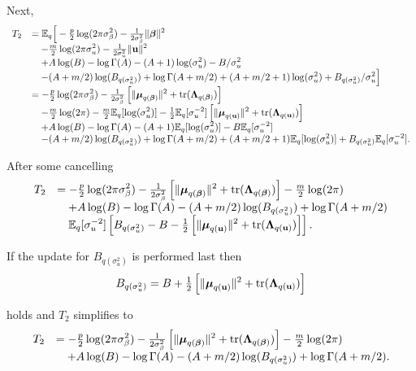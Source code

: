 \documentclass[a4paper,11pt]{article}
\begin{document}
Next,
$$
\begin{array}{rl}
T_2
    & \ds = \bE_q\Big[ 
    -\tfrac{p}{2}\log(2\pi\sigma_\beta^2) - \tfrac{1}{2\sigma_\beta^2}\|\vbeta\|^2 \\
    & \ds \quad -\tfrac{m}{2}\log(2\pi\sigma_u^2) - \tfrac{1}{2\sigma_u^2}\|\vu\|^2  \\
    & \ds \quad    + A\log(B) - \log\Gamma(A) -  (A + 1)\log(\sigma_u^2) - B/\sigma_u^2 \\
    & \ds \quad    - (A + m/2)\log(B_{q(\sigma_u^2)}) + \log\Gamma(A + m/2) +  (A + m/2 + 1)\log(\sigma_u^2) + B_{q(\sigma_u^2)}/\sigma_u^2 \Big]
    \\
     & \ds =   
     -\tfrac{p}{2}\log(2\pi\sigma_\beta^2) - \tfrac{1}{2\sigma_\beta^2}\left[ \|\vmu_{q(\vbeta)}\|^2 + \mbox{tr}(\mLambda_{q(\vbeta)})\right]\\
     & \ds \quad -\tfrac{m}{2}\log(2\pi) 
     -\tfrac{m}{2}\bE_q[\log(\sigma_u^2)]
     - \tfrac{1}{2}\bE_q[\sigma_u^{-2}]\left[ \|\vmu_{q(\vu)}\|^2 + \mbox{tr}(\mLambda_{q(\vu)})\right]  \\
     & \ds \quad    + A\log(B) - \log\Gamma(A) -  (A + 1)\bE_q[\log(\sigma_u^2)] - B\bE_q[\sigma_u^{-2}] \\
     & \ds \quad    - (A + m/2)\log(B_{q(\sigma_u^2)}) + \log\Gamma(A + m/2) +  (A + m/2 + 1)\bE_q[\log(\sigma_u^2)] + B_{q(\sigma_u^2)}\bE_q[\sigma_u^{-2}].
    
    
\end{array}
$$

\noindent After some cancelling
$$
\begin{array}{rl}
T_2
     & \displaystyle =   
     -\tfrac{p}{2}\log(2\pi\sigma_\beta^2) - \tfrac{1}{2\sigma_\beta^2}\left[ \|{\boldsymbol \mu}_{q({\boldsymbol \beta})}\|^2 + \mbox{tr}({\boldsymbol \Lambda}_{q({\boldsymbol \beta})})\right] -\tfrac{m}{2}\log(2\pi) \\
     & \displaystyle \quad + A\log(B) - \log\Gamma(A) - (A + m/2)\log(B_{q(\sigma_u^2)}) + \log\Gamma(A + m/2) \\
     & \displaystyle \quad {\mathbb E}_q[\sigma_u^{-2}]  
     \left[ 
     B_{q(\sigma_u^2)}    - B - \tfrac{1}{2}\left[ \|{\boldsymbol \mu}_{q({\bf u})}\|^2 + \mbox{tr}({\boldsymbol \Lambda}_{q({\bf u})})\right]    
     \right].
\end{array}
$$

\noindent If the update for $B_{q(\sigma_u^2)}$ is performed last then
$$
B_{q(\sigma_u^2)} = B + \tfrac{1}{2}\left[ \|{\boldsymbol \mu}_{q({\bf u})}\|^2 + \mbox{tr}({\boldsymbol \Lambda}_{q({\bf u})})\right]
$$

\noindent holds and $T_2$ simplifies to
$$
\begin{array}{rl}
T_2
     & \displaystyle =   
     -\tfrac{p}{2}\log(2\pi\sigma_\beta^2) - \tfrac{1}{2\sigma_\beta^2}\left[ \|{\boldsymbol \mu}_{q({\boldsymbol \beta})}\|^2 + \mbox{tr}({\boldsymbol \Lambda}_{q({\boldsymbol \beta})})\right] -\tfrac{m}{2}\log(2\pi) \\
     & \displaystyle \quad + A\log(B) - \log\Gamma(A) - (A + m/2)\log(B_{q(\sigma_u^2)}) + \log\Gamma(A + m/2). \\
\end{array}
$$
\end{document}

